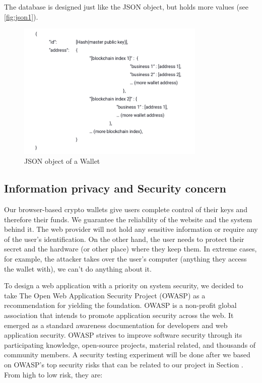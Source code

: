 The database is designed just like the JSON object, but holds more values (see \autoref{fig:json1}).

\begin{figure}[!ht]
    \centering
    \includegraphics[width=0.8\textwidth]{images/json1.png}
    \caption[General JSON object of a Wallet]{JSON object of a Wallet}
    \label{fig:json1}
\end{figure}


\subsection{Information privacy and Security concern}

Our browser-based crypto wallets give users complete control of their keys and therefore their funds. We guarantee the reliability of the website and the system behind it. The web provider will not hold any sensitive information or require any of the user's identification. On the other hand, the user needs to protect their secret and the hardware (or other place) where they keep them. In extreme cases, for example, the attacker takes over the user's computer (anything they access the wallet with), we can't do anything about it.

To design a web application with a priority on system security, we decided to take The Open Web Application Security Project (OWASP) as a recommendation for yielding the foundation. OWASP is a non-profit global association that intends to promote application security across the web. It emerged as a standard awareness documentation for developers and web application security. OWASP strives to improve software security through its participating knowledge, open-source projects, material related, and thousands of community members. A security testing experiment will be done after we based on OWASP's top security risks that can be related to our project in Section . From high to low risk, they are:

